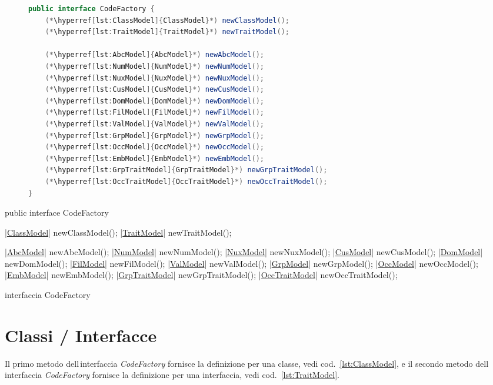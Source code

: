 \ifesource
\begin{figure*}[!htb]
\begin{lstlisting}[language=java, caption=interfaccia CodeFactory, 
label=lst:CodeFactory]
public interface CodeFactory {
    (*\hyperref[lst:ClassModel]{ClassModel}*) newClassModel();
    (*\hyperref[lst:TraitModel]{TraitModel}*) newTraitModel();

    (*\hyperref[lst:AbcModel]{AbcModel}*) newAbcModel();
    (*\hyperref[lst:NumModel]{NumModel}*) newNumModel();
    (*\hyperref[lst:NuxModel]{NuxModel}*) newNuxModel();
    (*\hyperref[lst:CusModel]{CusModel}*) newCusModel();
    (*\hyperref[lst:DomModel]{DomModel}*) newDomModel();
    (*\hyperref[lst:FilModel]{FilModel}*) newFilModel();
    (*\hyperref[lst:ValModel]{ValModel}*) newValModel();
    (*\hyperref[lst:GrpModel]{GrpModel}*) newGrpModel();
    (*\hyperref[lst:OccModel]{OccModel}*) newOccModel();
    (*\hyperref[lst:EmbModel]{EmbModel}*) newEmbModel();
    (*\hyperref[lst:GrpTraitModel]{GrpTraitModel}*) newGrpTraitModel();
    (*\hyperref[lst:OccTraitModel]{OccTraitModel}*) newOccTraitModel();
}
\end{lstlisting}
\end{figure*}
\else
\begin{elisting}[!htb]
\begin{javacode}
public interface CodeFactory {
    |\hyperref[lst:ClassModel]{ClassModel}| newClassModel();
    |\hyperref[lst:TraitModel]{TraitModel}| newTraitModel();

    |\hyperref[lst:AbcModel]{AbcModel}| newAbcModel();
    |\hyperref[lst:NumModel]{NumModel}| newNumModel();
    |\hyperref[lst:NuxModel]{NuxModel}| newNuxModel();
    |\hyperref[lst:CusModel]{CusModel}| newCusModel();
    |\hyperref[lst:DomModel]{DomModel}| newDomModel();
    |\hyperref[lst:FilModel]{FilModel}| newFilModel();
    |\hyperref[lst:ValModel]{ValModel}| newValModel();
    |\hyperref[lst:GrpModel]{GrpModel}| newGrpModel();
    |\hyperref[lst:OccModel]{OccModel}| newOccModel();
    |\hyperref[lst:EmbModel]{EmbModel}| newEmbModel();
    |\hyperref[lst:GrpTraitModel]{GrpTraitModel}| newGrpTraitModel();
    |\hyperref[lst:OccTraitModel]{OccTraitModel}| newOccTraitModel();
}
\end{javacode}
\caption{interfaccia CodeFactory}
\label{lst:CodeFactory}
\end{elisting}
\fi

\section{Classi / Interfacce}
Il primo metodo dell\,interfaccia \textsl{CodeFactory} fornisce la definizione 
per una classe, vedi cod.~\ref{lst:ClassModel}, e il secondo metodo 
dell\,interfaccia \textsl{CodeFactory} fornisce la definizione per una 
interfaccia, vedi cod.~\ref{lst:TraitModel}.


